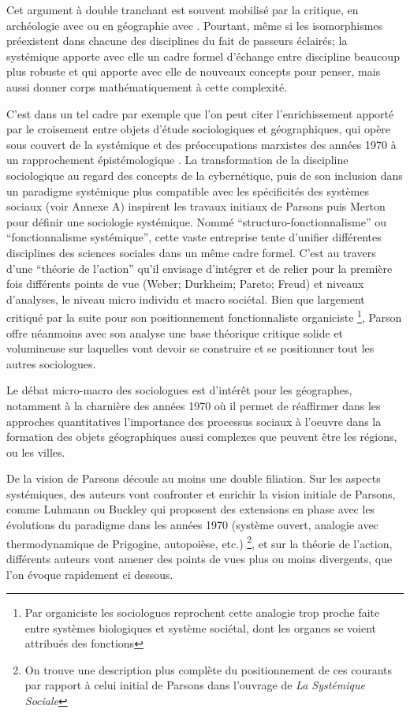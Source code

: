 Cet argument à double tranchant est souvent mobilisé par la critique, en archéologie avec \textcite{Salmon1978} ou en géographie avec \textcite{Chisholm1967}. Pourtant, même si les isomorphismes préexistent dans chacune des disciplines du fait de passeurs éclairés; la systémique apporte avec elle un cadre formel d'échange entre discipline beaucoup plus robuste et qui apporte avec elle de nouveaux concepts pour penser, mais aussi donner corps mathématiquement à cette complexité.

C'est dans un tel cadre par exemple que l'on peut citer l'enrichissement apporté par le croisement entre objets d'étude sociologiques et géographiques, qui opère sous couvert de la systémique et des préoccupations marxistes des années 1970 à un rapprochement épistémologique \autocite{Claval1995}. La transformation de la discipline sociologique au regard des concepts de la cybernétique, puis de son inclusion dans un paradigme systémique plus compatible avec les spécificités des systèmes sociaux (voir Annexe A) inspirent les travaux initiaux de Parsons puis Merton pour définir une sociologie systémique. Nommé \enquote{structuro-fonctionnalisme} ou \enquote{fonctionnalisme systémique}, cette vaste entreprise tente d'unifier différentes disciplines des sciences sociales dans un même cadre formel. C'est au travers d'une \enquote{théorie de l'action}  qu'il envisage d'intégrer et de relier pour la première fois différents points de vue (Weber; Durkheim; Pareto; Freud) et niveaux d'analyses, le niveau micro individu et macro sociétal. Bien que largement critiqué par la suite pour son positionnement fonctionnaliste organiciste \footnote{Par organiciste les sociologues reprochent cette analogie trop proche faite entre systèmes biologiques et système sociétal, dont les organes se voient attribués des fonctions}, Parson offre néanmoins avec son analyse une base théorique critique solide et volumineuse sur laquelles vont devoir se construire et se positionner tout les autres sociologues.

Le débat micro-macro des sociologues est d'intérêt pour les géographes, notamment à la charnière des années 1970 où il permet de réaffirmer dans les approches quantitatives l'importance des processus sociaux à l'oeuvre dans la formation des objets géographiques aussi complexes que peuvent être les régions, ou les villes.

De la vision de Parsons découle au moins une double filiation. Sur les aspects systémiques, des auteurs vont confronter et enrichir la vision initiale de Parsons, comme Luhmann ou Buckley qui proposent des extensions en phase avec les évolutions du paradigme dans les années 1970 (système ouvert, analogie avec thermodynamique de Prigogine, autopoièse, etc.) \footnote{On trouve une description plus complète du positionnement de ces courants par rapport à celui initial de Parsons dans l'ouvrage de \textcite{Lugan2009} \textit{La Systémique Sociale}}, et sur la théorie de l'action, différents auteurs vont amener des points de vues plus ou moins divergents, que l'on évoque rapidement ci dessous.

